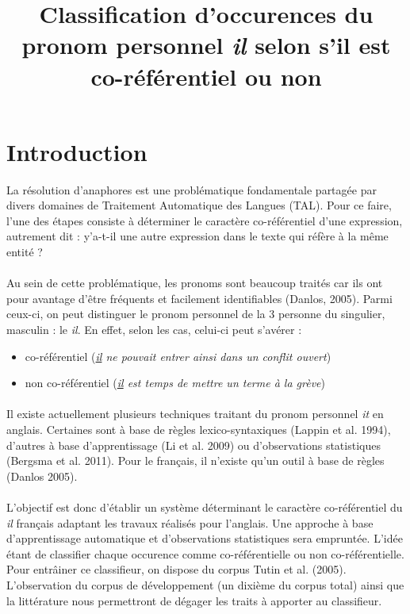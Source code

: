 \documentclass[a4paper,12pt]{article}
\title{Classification d'occurences du pronom personnel \og{}\textit{il}\fg{} selon s'il est co-référentiel ou non}
\author{}
\begin{document}
\maketitle

\begin{abstract}
\end{abstract}

\section*{Introduction}

La résolution d'anaphores est une problématique fondamentale partagée par divers domaines de Traitement Automatique des Langues (TAL).
Pour ce faire, l'une des étapes consiste à déterminer le caractère co-référentiel d'une expression, autrement dit : y'a-t-il une autre expression dans le texte qui réfère à la même entité ?

\paragraph{}
Au sein de cette problématique, les pronoms sont beaucoup traités car ils ont pour avantage d'être fréquents et facilement identifiables (Danlos, 2005).
Parmi ceux-ci, on peut distinguer le pronom personnel de la 3 personne du singulier, masculin : le \og{}\textit{il}\fg{}. 
En effet, selon les cas, celui-ci peut s'avérer : 
\begin{itemize}
 \item co-référentiel (\og{}\textit{\underline{il} ne pouvait entrer ainsi dans un conflit ouvert}\fg{})
 \item non co-référentiel (\og{}\textit{\underline{il} est temps de mettre un terme à la grève}\fg{})
\end{itemize}

\paragraph{}
Il existe actuellement plusieurs techniques traitant du pronom personnel \og{}\textit{it}\fg{} en anglais.
Certaines sont à base de règles lexico-syntaxiques (Lappin et al. 1994), d'autres à base d'apprentissage (Li et al. 2009) ou d'observations statistiques (Bergsma et al. 2011).
Pour le français, il n'existe qu'un outil à base de règles (Danlos 2005).

\paragraph{}
L'objectif est donc d'établir un système déterminant le caractère co-référentiel du \og{}\textit{il}\fg{} français adaptant les travaux réalisés pour l'anglais. Une approche à base d'apprentissage automatique et d'observations statistiques sera empruntée. L'idée étant de classifier chaque occurence comme co-référentielle ou non co-référentielle.
Pour entrâiner ce classifieur, on dispose du corpus Tutin et al. (2005). L'observation du corpus de développement (un dixième du corpus total) ainsi que la littérature nous permettront de dégager les traits à apporter au classifieur.
\end{document}
